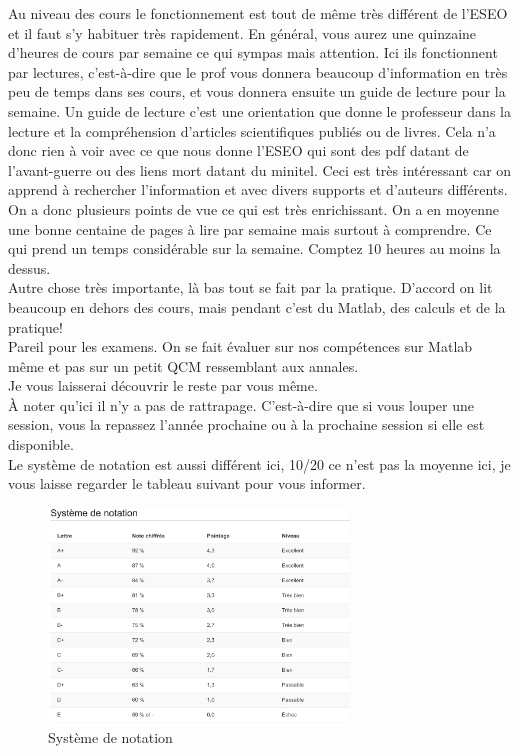 Au niveau des cours le fonctionnement est tout de même très différent de l'ESEO et il faut s'y habituer très rapidement. En général, vous aurez une quinzaine d'heures de cours par semaine ce qui sympas mais attention. Ici ils fonctionnent par lectures, c'est-à-dire que le prof vous donnera beaucoup d'information en très peu de temps dans ses cours, et vous donnera ensuite un guide de lecture pour la semaine. Un guide de lecture c'est une orientation que donne le professeur dans la lecture et la compréhension d'articles scientifiques publiés ou de livres. Cela n'a donc rien à voir avec ce que nous donne l'ESEO qui sont des pdf datant de l'avant-guerre ou des liens mort datant du minitel. Ceci est très intéressant car on apprend à rechercher l'information et avec divers supports et d'auteurs différents. On a donc plusieurs points de vue ce qui est très enrichissant. On a en moyenne une bonne centaine de pages à lire par semaine mais surtout à comprendre. Ce qui prend un temps considérable sur la semaine. Comptez 10 heures au moins la dessus. \\
Autre chose très importante, là bas tout se fait par la pratique. D'accord on lit beaucoup en dehors des cours, mais pendant c'est du Matlab, des calculs et de la pratique! \\
Pareil pour les examens. On se fait évaluer sur nos compétences sur Matlab même et pas sur un petit QCM ressemblant aux annales.\\
Je vous laisserai découvrir le reste par vous même.\\
À noter qu'ici il n'y a pas de rattrapage. C'est-à-dire que si vous louper une session, vous la repassez l'année prochaine ou à la prochaine session si elle est disponible. \\
Le système de notation est aussi différent ici, 10/20 ce n'est pas la moyenne ici, je vous laisse regarder le tableau suivant pour vous informer.


\begin{figure}[h!]
\centering
\includegraphics[width = 80mm]{figures/Sys_Notation}
\caption{Système de notation}
\end{figure}



